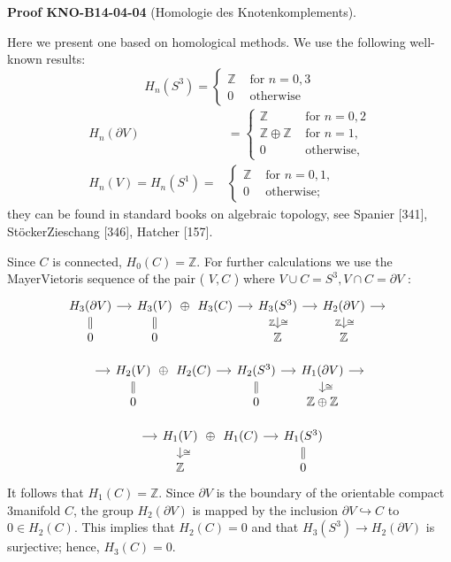 \documentclass[10pt, letterpaper]{article}
\newcommand{\CustomHeading}[3]{%
  \par\medskip\noindent%
  \textbf{#1 #2} \textnormal{(#3)}.\enskip%
}
\newenvironment{PROOF}[2]{\begin{unitbox}\CustomHeading{Proof}{#1}{#2}}{\end{unitbox}}
\begin{document}
\begin{PROOF}{KNO-B14-04-04}{Homologie des Knotenkomplements}
Here we present one based on homological methods. We use the following well-known results:
$$
H_{n}\left(S^{3}\right)= \begin{cases}\mathbb{Z} & \text { for } n=0,3 \\ 0 & \text { otherwise }\end{cases}
$$
$$
\begin{aligned}
H_{n}(\partial V) & = \begin{cases}\mathbb{Z} & \text { for } n=0,2 \\
\mathbb{Z} \oplus \mathbb{Z} & \text { for } n=1, \\
0 & \text { otherwise, }\end{cases} \\
H_{n}(V)=H_{n}\left(S^{1}\right)= & \begin{cases}\mathbb{Z} & \text { for } n=0,1, \\
0 & \text { otherwise; }\end{cases}
\end{aligned}
$$
they can be found in standard books on algebraic topology, see Spanier [341], StöckerZieschang [346], Hatcher [157].

Since $C$ is connected, $H_{0}(C)=\mathbb{Z}$. For further calculations we use the MayerVietoris sequence of the pair ( $V, C$ ) where $V \cup C=S^{3}, V \cap C=\partial V$ :
\[
\begin{tikzcd}[row sep=small, column sep=small]
H_3(\partial V) \arrow[r] \arrow[d, equal] 
  & H_3(V) \arrow[r, phantom, "\oplus"] \arrow[d, equal] 
  & H_3(C) \arrow[r] 
  & H_3(S^3) \arrow[r] \arrow[d, "\cong", "\mathbb{Z}"']
  & H_2(\partial V) \arrow[r] \arrow[d, "\cong", "\mathbb{Z}"'] 
  & {} \\
0 & 0 & {} & \mathbb{Z} & \mathbb{Z} & {}
\end{tikzcd}
\]

\[
\begin{tikzcd}[row sep=small, column sep=small]
{} \arrow[r]
  & H_2(V) \arrow[r, phantom, "\oplus"] \arrow[d, equal]
  & H_2(C) \arrow[r] 
  & H_2(S^3) \arrow[r] \arrow[d, equal]
  & H_1(\partial V) \arrow[r] \arrow[d, "\cong"]
  & {} \\
{} & 0 & {}& 0 & \mathbb{Z} \oplus \mathbb{Z} & {}
\end{tikzcd}
\]

\[
\begin{tikzcd}[row sep=small, column sep=small]
{} \arrow[r] 
  & H_1(V) \arrow[r, phantom, "\oplus"] \arrow[d, "\cong"] & H_1(C) \arrow[r]
  & H_1(S^3) \arrow[d, equal] \\
{} & \mathbb{Z} & {} & 0
\end{tikzcd}
\]
It follows that $H_{1}(C)=\mathbb{Z}$. Since $\partial V$ is the boundary of the orientable compact 3manifold $C$, the group $H_{2}(\partial V)$ is mapped by the inclusion $\partial V \hookrightarrow C$ to $0 \in H_{2}(C)$. This implies that $H_{2}(C)=0$ and that $H_{3}\left(S^{3}\right) \rightarrow H_{2}(\partial V)$ is surjective; hence, $H_{3}(C)=0$.



\end{PROOF}
\end{document}
